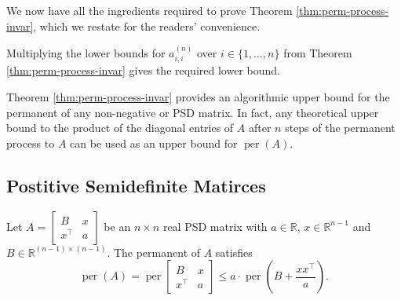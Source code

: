 \documentclass[11pt]{article}
\makeatletter
\theoremstyle{definition}
\newenvironment{proof}[1][\protect\proofname]{\par
	\normalfont\topsep6\p@\@plus6\p@\relax
	\trivlist
	\itemindent\parindent        %
	\item[\hskip\labelsep\scshape #1]\ignorespaces
}{%
	\endtrivlist\@endpefalse
}
\providecommand{\proofname}{Proof}
\DeclareMathOperator{\per}{per}
\makeatother
\begin{document}
We now have all the ingredients required to prove Theorem \ref{thm:perm-process-invar}, which we restate for the readers' convenience.
\permprocess*

\begin{proof}
	Multiplying the lower bounds for $a_{i,i}^{(n)}$ over $i \in \{1,\ldots, n\}$ from Theorem \ref{thm:perm-process-invar} gives the required lower bound.
\end{proof}

Theorem \ref{thm:perm-process-invar} provides an algorithmic upper bound for the permanent of any non-negative or PSD matrix. In fact, any theoretical upper bound to the product of the diagonal entries of $A$ after $n$ steps of the permanent process to $A$ can be used as an upper bound for $\per(A)$. 

\subsection{Postitive Semidefinite Matirces} \label{subsec:psd}
\begin{lemma}
\label{lem:psd-ineq}
    Let $A = \begin{bmatrix}
        B & x \\
        x^\top & a
    \end{bmatrix}$ be an $n \times n$ real PSD matrix with $a \in \mathbb{R}$, $x \in \mathbb{R}^{n-1}$ and $B \in \mathbb{R}^{(n-1)\times (n-1)}$. The permanent of $A$ satisfies  
    \begin{equation*}
       \per(A) =  \per\begin{bmatrix}
        B & x \\
        x^\top & a
    \end{bmatrix} \leq a \cdot \per\left( B + \frac{xx^\top}{a} \right).
    \end{equation*}
\end{lemma}
\end{document}

